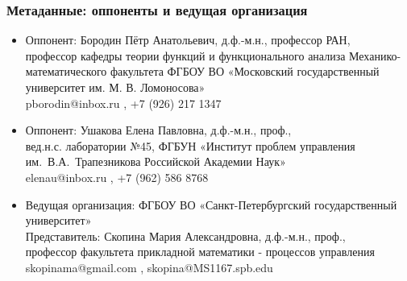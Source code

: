 \begin{frame}\frametitle{Метаданные: оппоненты и ведущая организация}
	\begin{itemize}
		\item
			Оппонент: Бородин Пётр Анатольевич, д.ф.-м.н., профессор РАН,
			\\
			профессор кафедры теории функций и функционального анализа Механико-математического факультета
			ФГБОУ ВО «Московский государственный университет им. М. В. Ломоносова»
			\\
			pborodin@inbox.ru , +7 (926) 217 1347
		\item
			Оппонент: Ушакова Елена Павловна, д.ф.-м.н., проф.,
			\\
			вед.н.с. лаборатории №45,
			ФГБУН «Институт проблем управления им.~В.А.~Трапезникова Российской Академии Наук»
			\\
			elenau@inbox.ru , +7 (962) 586 8768
		\item
			Ведущая организация:
			ФГБОУ ВО «Санкт-Петербургский государственный университет»
			\\
			Представитель:
			Скопина Мария Александровна, д.ф.-м.н., проф.,
			\\
			профессор факультета прикладной математики - процессов управления
			\\
			skopinama@gmail.com , skopina@MS1167.spb.edu
	\end{itemize}
\end{frame}


